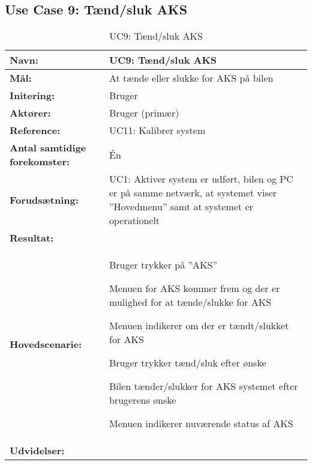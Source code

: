 \subsection{Use Case 9: Tænd/sluk AKS}
\begin{table}[h]
\begin{tabularx}{\textwidth}{| L{3.3 cm} | Z |} \hline

\textbf{Navn:} 						& UC9: Tænd/sluk AKS \\ \hline
\textbf{Mål:}						& At tænde eller slukke for AKS på bilen \\ \hline
\textbf{Initering:}					& Bruger \\ \hline
\textbf{Aktører:} 					& Bruger (primær) \\ \hline %
\textbf{Reference:} 					& UC11: Kalibrer system\\ \hline
\textbf{Antal samtidige forekomster:} & Én \\ \hline
\textbf{Forudsætning:} 				& UC1: Aktiver system er udført, bilen og PC er på samme netværk, at systemet viser ''Hovedmenu'' samt at systemet er operationelt\\ \hline
\textbf{Resultat:}					&  \\ \hline
\textbf{Hovedscenarie:}				& 

\begin{packed_enum}
\item Bruger trykker på ''AKS'' 
\item Menuen for AKS kommer frem og der er mulighed for at tænde/slukke for AKS 
\item Menuen indikerer om der er tændt/slukket for AKS
\item Bruger trykker tænd/sluk efter ønske
\item Bilen tænder/slukker for AKS systemet efter brugerens ønske
\item Menuen indikerer nuværende status af AKS
\end{packed_enum} \\ \hline
\textbf{Udvidelser:}				&  
~
\\ \hline
\end{tabularx}
\caption{UC9: Tænd/sluk AKS}
\label{tbl:UC9}
\end{table}